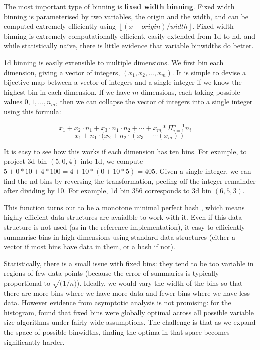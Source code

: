 \documentclass[journal]{vgtc}                %
\begin{document}
The most important type of binning is {\bf fixed width binning}. Fixed width binning is parameterised by two variables, the origin and the width, and can be computed extremely efficiently using $\left \lfloor (x - origin) / width \right \rfloor $. Fixed width binning is extremely computationally efficient, easily extended from 1d to nd, and while statistically na\"ive, there is little evidence that variable binwidths do better.

1d binning is easily extensible to multiple dimensions. We first bin each dimension, giving a vector of integers, $(x_1, x_2, ..., x_m)$. It is simple to devise a bijective map between a vector of integers and a single integer if we know the highest bin in each dimension. If we have $m$ dimensions, each taking possible values $0, 1, \ldots, n_m$, then we can collapse the vector of integers into a single integer using this formula:

\[ x_1 + x_2 \cdot n_1 + x_3 \cdot n_1 \cdot n_2 + \cdots + x_m * \Pi^{n-1}_{i = 1} n_i = \]
\[ x_1 + n_1 \cdot (x_2 + n_2 \cdot (x_3 + \cdots(x_m)) \]

It is easy to see how this works if each dimension has ten bins. For example, to project 3d bin $(5, 0, 4)$ into 1d, we compute $5 + 0 * 10 + 4 * 100 = 4 + 10 * (0 + 10 * 5) = 405$. Given a single integer, we can find the nd bins by reversing the transformation, peeling off the integer remainder after dividing by 10. For example, 1d bin $356$ corresponds to 3d bin $(6, 5, 3)$.

This function turns out to be a monotone minimal perfect hash \citep{belazzougui:2009}, which means highly efficient data structures are avaialble to work with it. Even if this data structure is not used (as in the reference implementation), it easy to efficiently summarise bins in high-dimensions using standard data structures (either a vector if most bins have data in them, or a hash if not).

Statistically, there is a small issue with fixed bins: they tend to be too variable in regions of few data points (because the error of summaries is typically proportional to $\sqrt(1/n)$). Ideally, we would vary the width of the bins so that there are more bins where we have more data and fewer bins where we have less data. However evidence from asymptotic analysis is not promising: for the histogram, \cite{kogure:1987} found that fixed bins were globally optimal across all possible variable size algorithms under fairly wide assumptions. The challenge is that as we expand the space of possible binwidths, finding the optima in that space becomes significantly harder. 
\end{document}
